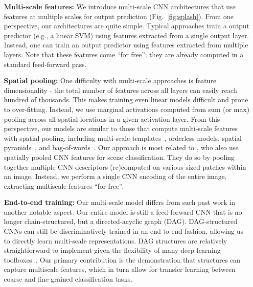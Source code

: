 \documentclass[10pt,twocolumn,letterpaper]{article}
\begin{document}
{\bf Multi-scale features:} We introduce multi-scale CNN architectures that use features at multiple scales for output prediction (Fig.~\ref{fig:splash}). From one perspective, our architectures are quite simple. Typical approaches train a output predictor (e.g., a linear SVM) using features extracted from a single output layer. Instead, one can train an output predictor using features extracted from multiple layers. Note that these features come ``for free''; they are already computed in a standard feed-forward pass. 

{\bf Spatial pooling:} One difficulty with multi-scale approaches is feature dimensionality - the total number of features across all layers can easily reach hundred of thousands. This makes training even linear models difficult and prone to over-fitting. Instead, we use marginal activations computed from sum (or max) pooling across all spatial locations in a given activation layer. From this perspective, our models are similar to those that compute multi-scale features with spatial pooling, including multi-scale templates~\cite{felzenszwalb2008discriminatively}, orderless models\cite{Gong14}, spatial pyramids~\cite{spatial_pyramid}, and bag-of-words~\cite{sivic2003video}. Our approach is most related to \cite{Gong14}, who also use spatially pooled CNN features for scene classification. They do so by pooling together multiple CNN descriptors (re)computed on various-sized patches within an image. Instead, we perform a single CNN encoding of the entire image, extracting multiscale features ``for free''.

{\bf End-to-end training:} Our multi-scale model differs from such past work in another notable aspect. Our entire model is still a feed-forward CNN that is no longer chain-structured, but a directed-acyclic graph (DAG). DAG-structured CNNs can still be discriminatively trained in an end-to-end fashion, allowing us to directly learn multi-scale representations. %
DAG structures are relatively straightforward to implement given the flexibility of many deep learning toolboxes~\cite{vedaldimatconvnet,Caffe,overfeat}. Our primary contribution is the demonstration that structures can capture multiscale features, which in turn allow for transfer learning between coarse and fine-grained classification tasks.
\end{document}
